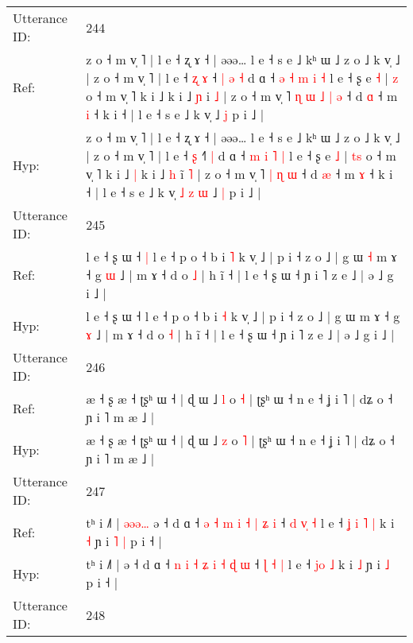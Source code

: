\documentclass[10pt]{article}
\DeclareRobustCommand{\hl}[1]{{\textcolor{red}{#1}}}
\begin{document}
\begin{longtable}{ll}
 \\
\midrule
Utterance ID: & 244 \\
Ref: & z o ˧ m v̩ ˥ | l e ˧ ʐ ɤ ˧ | əəə… l e ˧ s e ˩ kʰ ɯ ˩ z o ˩ k v̩ ˩ | z o ˧ m v̩ ˥ | l e ˧\hl{ }\hl{ʐ} \hl{ɤ} ˧\hl{ }\hl{|}\hl{ }\hl{ə} \hl{˧} d ɑ ˧\hl{ }\hl{ə} \hl{˧} \hl{m} \hl{i} \hl{˧} l e ˧ ʂ e \hl{˧} | \hl{}\hl{z} o ˧ m v̩ ˥ k i ˩\hl{}\hl{} k i ˩ \hl{ɲ} i\hl{} \hl{˩} | z o ˧ m v̩ ˥\hl{ }\hl{ɳ}\hl{ }\hl{ɯ} \hl{˩} \hl{|} \hl{ə} ˧ d \hl{ɑ} ˧ m \hl{i} ˧ k i ˧ | l e ˧ s e ˩ k v̩\hl{}\hl{}\hl{}\hl{}\hl{}\hl{} ˩ \hl{j} p i ˩ |
 \\
Hyp: & z o ˧ m v̩ ˥ | l e ˧ ʐ ɤ ˧ | əəə… l e ˧ s e ˩ kʰ ɯ ˩ z o ˩ k v̩ ˩ | z o ˧ m v̩ ˥ | l e ˧\hl{}\hl{} \hl{ʂ} ˧\hl{}\hl{}\hl{}\hl{˥} \hl{|} d ɑ ˧\hl{}\hl{} \hl{m} \hl{i} \hl{˥} \hl{|} l e ˧ ʂ e \hl{˩} | \hl{t}\hl{s} o ˧ m v̩ ˥ k i ˩\hl{ }\hl{|} k i ˩ \hl{h} i\hl{̃} \hl{˥} | z o ˧ m v̩ ˥\hl{}\hl{}\hl{}\hl{} \hl{|} \hl{ɳ} \hl{ɯ} ˧ d \hl{æ} ˧ m \hl{ɤ} ˧ k i ˧ | l e ˧ s e ˩ k v̩\hl{ }\hl{˩}\hl{ }\hl{z}\hl{ }\hl{ɯ} ˩ \hl{|} p i ˩ |
 \\
\midrule
Utterance ID: & 245 \\
Ref: & l e ˧ ʂ ɯ ˧\hl{ }\hl{|} l e ˧ p o ˧ b i \hl{˥} k v̩ ˩ | p i ˧ z o ˩ | g ɯ\hl{ }\hl{˧} m ɤ ˧ g \hl{ɯ} ˩ | m ɤ ˧ d o \hl{˩} | h ĩ ˧ | l e ˧ ʂ ɯ ˧ ɲ i ˥ z e ˩ | ə ˩ g i ˩ |
 \\
Hyp: & l e ˧ ʂ ɯ ˧\hl{}\hl{} l e ˧ p o ˧ b i \hl{˧} k v̩ ˩ | p i ˧ z o ˩ | g ɯ\hl{}\hl{} m ɤ ˧ g \hl{ɤ} ˩ | m ɤ ˧ d o \hl{˧} | h ĩ ˧ | l e ˧ ʂ ɯ ˧ ɲ i ˥ z e ˩ | ə ˩ g i ˩ |
 \\
\midrule
Utterance ID: & 246 \\
Ref: & æ ˧ ʂ æ ˧ ʈʂʰ ɯ ˧ | ɖ ɯ ˩ \hl{l} o \hl{˧} | ʈʂʰ ɯ ˧ n e ˧ ʝ i ˥ | dʑ o ˧ ɲ i ˥ m æ ˩ |
 \\
Hyp: & æ ˧ ʂ æ ˧ ʈʂʰ ɯ ˧ | ɖ ɯ ˩ \hl{z} o \hl{˥} | ʈʂʰ ɯ ˧ n e ˧ ʝ i ˥ | dʑ o ˧ ɲ i ˥ m æ ˩ |
 \\
\midrule
Utterance ID: & 247 \\
Ref: & tʰ i ˩˥ |\hl{ }\hl{ə}\hl{ə}\hl{ə}\hl{…} ə ˧ d ɑ ˧ \hl{ə} \hl{˧} \hl{m} \hl{i} \hl{˧} \hl{|} \hl{ʑ} \hl{i} ˧ \hl{d} \hl{v}\hl{̩} \hl{˧} l e ˧\hl{ }\hl{ʝ} \hl{i}\hl{ }\hl{˥} \hl{|} k i \hl{˧} ɲ i\hl{ }\hl{˥} \hl{|} p i ˧ |
 \\
Hyp: & tʰ i ˩˥ |\hl{}\hl{}\hl{}\hl{}\hl{} ə ˧ d ɑ ˧ \hl{n} \hl{i} \hl{˧} \hl{ʑ} \hl{i} \hl{˧} \hl{ɖ} \hl{ɯ} ˧ \hl{ɭ} \hl{}\hl{˧} \hl{|} l e ˧\hl{}\hl{} \hl{}\hl{j}\hl{o} \hl{˩} k i \hl{˩} ɲ i\hl{}\hl{} \hl{˩} p i ˧ |
 \\
\midrule
Utterance ID: & 248 \\

\end{longtable}
\end{document}
